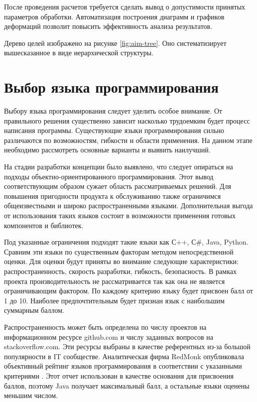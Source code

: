 \documentclass[14pt,oneside,final]{extreport}
\begin{document}
	После проведения расчетов требуется сделать вывод о допустимости принятых параметров обработки. Автоматизация построения диаграмм и графиков деформаций позволит повысить эффективность анализа результатов. 
	
	Дерево целей изображено на рисунке \ref{fig:aim-tree}. Оно систематизирует вышесказанное в виде иерархической структуры. 
		
	
				
	\section{Выбор языка программирования}
	Выбору языка программирования следует уделить особое внимание. От правильного решения существенно зависит насколько трудоемким будет процесс написания программы. Существующие языки программирования сильно различаются по возможностям, гибкости и области применения. На данном этапе необходимо рассмотреть основные варианты и выявить наилучший. 
	
	На стадии разработки концепции было выявлено, что следует опираться на подходы объектно-ориентированного программирования. Этот вывод соответствующим образом сужает область рассматриваемых решений. Для повышения пригодности продукта к обслуживанию также ограничимся общеизвестными и широко распространенными языками. Дополнительная выгода от использования таких языков состоит в возможности применения готовых компонентов и библиотек. 
	
	Под указанные ограничения подходят такие языки как С++, С\#, Java, Python. Сравним эти языки по существенным факторам методом непосредственной оценки. Для оценки будут приняты во внимание следующие характеристики: распространенность, скорость разработки, гибкость, безопасность. В рамках проекта производительность не рассматривается так как она не является ограничивающим фактором. По каждому критерию языку будет присвоен балл от 1 до 10. Наиболее предпочтительным будет признан язык с наибольшим суммарным баллом. 
	
	Распространенность может быть определена по числу проектов на информационном ресурсе github.com и числу заданных вопросов на stackoverflow.com. Эти ресурсы выбраны в качестве референтных из-за большой популярности в IT сообществе. Аналитическая фирма RedMonk опубликовала объективный рейтинг языков программирования в соответствии с указанными критериями \cite{web:RedMonk}. Этот отчет использован в качестве основания для присвоения баллов, поэтому Java получает максимальный балл, а остальные языки оценены меньшим числом. 
	
\end{document}
